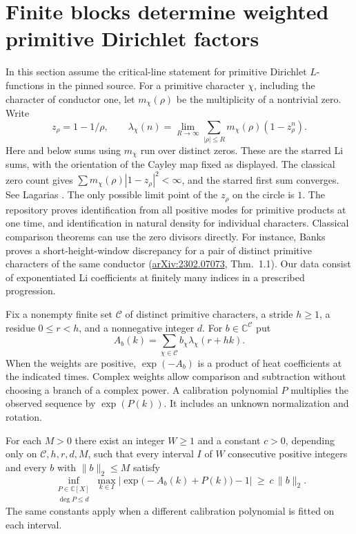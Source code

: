 \section{Finite blocks determine weighted primitive Dirichlet factors}
\label{sec:prog}

In this section assume the critical-line statement for primitive Dirichlet
$L$-functions in the pinned source. For a primitive character $\chi$,
including the character of conductor one, let $m_\chi(\rho)$ be the multiplicity
of a nontrivial zero. Write
\[
   z_\rho=1-1/\rho,\qquad
   \lambda_\chi(n)=\lim_{R\to\infty}
      \sum_{|\rho|\le R}m_\chi(\rho)(1-z_\rho^n).
\]
Here and below sums using $m_\chi$ run over distinct zeros. These are the
starred Li sums, with the orientation of the Cayley map fixed as displayed.
The classical zero count gives $\sum m_\chi(\rho)|1-z_\rho|^2<\infty$,
and the starred first sum converges. See Lagarias \cite{LagariasLi}.
The only possible limit point of the $z_\rho$ on the circle is $1$.
The repository proves identification from all positive modes for primitive
products at one time, and identification in natural density for individual
characters. Classical comparison theorems can use the zero divisors
directly. For instance, Banks proves a short-height-window discrepancy for
a pair of distinct primitive characters of the same conductor
(\href{https://arxiv.org/abs/2302.07073}{arXiv:2302.07073}, Thm.~1.1).
Our data consist of exponentiated Li coefficients at finitely many indices
in a prescribed progression.

Fix a nonempty finite set $\mathcal C$ of distinct primitive characters,
a stride $h\ge1$, a residue $0\le r<h$, and a nonnegative integer $d$.
For $b\in\mathbb C^{\mathcal C}$ put
\[
          A_b(k)=\sum_{\chi\in\mathcal C} b_\chi\lambda_\chi(r+hk).
\]
When the weights are positive, $\exp(-A_b)$ is a product of
heat coefficients at the indicated times. Complex weights allow comparison
and subtraction without choosing a branch of a complex power. A calibration
polynomial $P$ multiplies the observed sequence by $\exp(P(k))$.
It includes an unknown normalization and rotation.

\begin{theorem}\label{thm:calibrated}
For each $M>0$ there exist an integer $W\ge1$ and a constant $c>0$,
depending only on $\mathcal C,h,r,d,M$, such that every interval $I$
of $W$ consecutive positive integers and every $b$ with $\|b\|_2\le M$ satisfy
\begin{equation}
 \inf_{\substack{P\in\mathbb C[X]\\ \deg P\le d}}
     \max_{k\in I}\left|\exp\big(-A_b(k)+P(k)\big)-1\right|
      \ \ge\ c\,\|b\|_2 .
 \label{eq:calibration}
\end{equation}
The same constants apply when a different calibration polynomial is fitted
on each interval.
\end{theorem}

